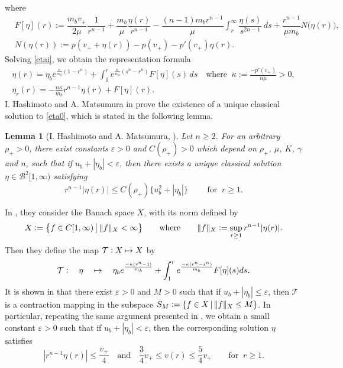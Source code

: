 \documentclass[a4paper,12pt,draft]{article}
\newtheorem{lemma}[theorem]{Lemma}
\theoremstyle{remark}
\def\ep{\varepsilon}
\begin{document}
where
\begin{align*}
&F[\eta](r):= \dfrac{m_b v_{+}}{2\mu} \dfrac{1}{r^{n-1}} + \dfrac{m_b}{\mu}\dfrac{\eta(r)}{r^{n-1}} - \dfrac{(n-1)m_b r^{n-1}}{\mu} \int_{r}^{\infty}\!\!\dfrac{\eta(s)}{s^{2n-1}}\,ds + \dfrac{r^{n-1}}{\mu m_b} N\big(\eta(r)\big),\\
& N(\eta(r)) :=p(v_++\eta(r))-p(v_+)-p'(v_+)\eta(r).
\end{align*}
Solving \eqref{etai}, we obtain the representation formula
\begin{gather}
\label{etae}
\eta(r)=\eta_b e^{\frac{\kappa}{m_b}(1-r^n)} + \int_{1}^{r} e^{\frac{\kappa}{m_b}(s^n-r^n)} F[\eta](s)\, {d} s\quad \text{where } \ \kappa:=\frac{-p'(v_+)}{n\mu}>0,\\
\label{etae2}
\eta_r(r) = - \frac{n\kappa }{m_b} r^{n-1} \eta(r) + F[\eta](r). 
\end{gather}
I. Hashimoto and A. Matsumura in \cite{h-m21} prove the existence of a unique classical solution to \eqref{eta0}, which is stated in the following lemma.
\begin{lemma}[I. Hashimoto and A. Matsumura, \cite{h-m21}] \label{lem:H-M21}
    Let $n\ge 2$. For an arbitrary $\rho_{+}>0$, there exist constants $\ep>0$ and $C(\rho_+)>0$ which depend on $\rho_{+}$, $\mu$, $K$, $\gamma$ and $n$, such that if $u_b+|\eta_b|<\ep$, then there exists a unique classical solution $\eta\in \mathcal{B}^2[1,\infty)$ satisfying
    \begin{equation}\label{h-m-rate}
        r^{n-1}|\eta(r)| \le C(\rho_{+})  \big\{ u_b^2 + |\eta_b| \big\} \qquad \text{ for } \ r\ge 1. 
    \end{equation}
\end{lemma}
In \cite{h-m21}, they consider the Banach space $X$, with its norm defined by
\begin{equation*}
    X \vcentcolon= \big\{ f\in C[1,\infty) \, \big\vert \,  \|f\|_{X} <\infty \big\} \qquad \text{where} \qquad \|f\|_{X} \vcentcolon= \sup\limits_{r\ge 1} r^{n-1}|\eta(r)|.
\end{equation*}
Then they define the map $\mathcal{T} \vcentcolon X \mapsto X$ by
\begin{align*}
    \mathcal{T} \vcentcolon \quad \eta \quad  \mapsto \quad \eta_b e^{\frac{-\kappa(r^n-1)}{m_b}} + \int_{1}^{r} e^{\frac{-\kappa(r^n-s^n)}{m_b}} F[\eta](s) {d} s.   
\end{align*}
It is shown in \cite{h-m21,h-n-s23} that there exist $\ep>0$ and $M>0$ such that if $u_b + |\eta_b| \le \ep$, then $\mathcal{T}$ is a contraction mapping in the subspace $S_{M}\vcentcolon= \{ f\in X \, \vert\, \|f\|_{X} \le M \}$. In particular, repeating the same argument presented in \cite{h-m21}, we obtain a small constant $\ep>0$ such that if $u_b+ |\eta_b|<\ep$, then the corresponding solution $\eta$ satisfies
\begin{equation}\label{E0}
    |r^{n-1}\eta(r)| \le \frac{v_+}{4} \quad \text{and} \quad \frac{3}{4} v_{+}  \le v(r) \le \frac{5}{4}v_{+} \qquad \text{for } \ r\ge 1.
\end{equation}
\end{document}
